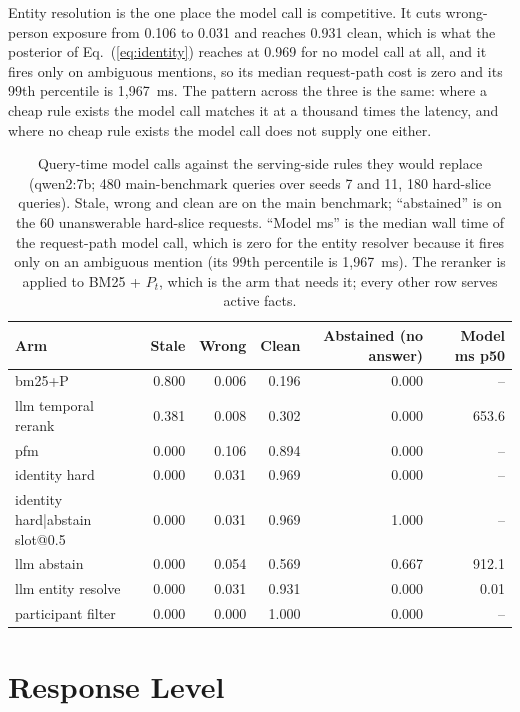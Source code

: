 \documentclass{article} %
\begin{document}
Entity resolution is the one place the model call is competitive. It cuts wrong-person exposure from 0.106 to 0.031 and reaches 0.931 clean, which is what the posterior of Eq.~(\ref{eq:identity}) reaches at 0.969 for no model call at all, and it fires only on ambiguous mentions, so its median request-path cost is zero and its 99th percentile is 1{,}967~ms. The pattern across the three is the same: where a cheap rule exists the model call matches it at a thousand times the latency, and where no cheap rule exists the model call does not supply one either.

\begin{table}[h]
\centering
\small
\setlength{\tabcolsep}{4pt}
\begin{tabular}{@{}lrrrrr@{}}
\toprule
Arm & Stale & Wrong & Clean & Abstained (no answer) & Model ms p50 \\
\midrule
bm25+P & 0.800 & 0.006 & 0.196 & 0.000 & -- \\
llm temporal rerank & 0.381 & 0.008 & 0.302 & 0.000 & 653.6 \\
pfm & 0.000 & 0.106 & 0.894 & 0.000 & -- \\
identity hard & 0.000 & 0.031 & 0.969 & 0.000 & -- \\
identity hard|abstain slot@0.5 & 0.000 & 0.031 & 0.969 & 1.000 & -- \\
llm abstain & 0.000 & 0.054 & 0.569 & 0.667 & 912.1 \\
llm entity resolve & 0.000 & 0.031 & 0.931 & 0.000 & 0.01 \\
participant filter & 0.000 & 0.000 & 1.000 & 0.000 & -- \\
\bottomrule
\end{tabular}
\caption{Query-time model calls against the serving-side rules they would replace (qwen2:7b; 480 main-benchmark queries over seeds 7 and 11, 180 hard-slice queries). Stale, wrong and clean are on the main benchmark; ``abstained'' is on the 60 unanswerable hard-slice requests. ``Model ms'' is the median wall time of the request-path model call, which is zero for the entity resolver because it fires only on an ambiguous mention (its 99th percentile is 1{,}967~ms). The reranker is applied to BM25 + $P_t$, which is the arm that needs it; every other row serves active facts.}
\label{tab:systems}
\end{table}

\section{Response Level}
\label{app:llm}
\end{document}
